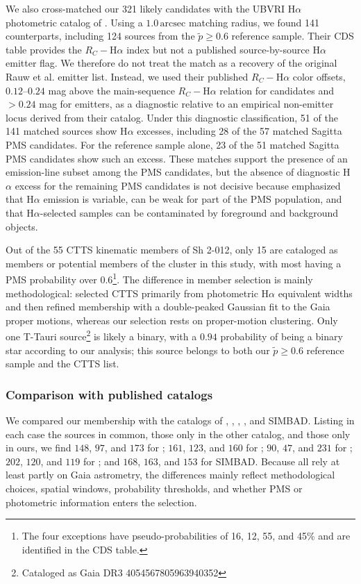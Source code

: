 \documentclass{aa}
\begin{document}
We also cross-matched our 321 likely candidates with the UBVRI H$\alpha$ photometric catalog of \citet{2010AA...511A..25R}. Using a $1.0\,\mathrm{arcsec}$ matching radius, we found 141 counterparts, including 124 sources from the $\tilde{p}\geq0.6$ reference sample. Their CDS table provides the $R_C-\mathrm{H}\alpha$ index but not a published source-by-source H$\alpha$ emitter flag. We therefore do not treat the match as a recovery of the original Rauw et al. emitter list. Instead, we used their published $R_C-\mathrm{H}\alpha$ color offsets, $0.12$--$0.24$ mag above the main-sequence $R_C-\mathrm{H}\alpha$ relation for candidates and $>0.24$ mag for emitters, as a diagnostic relative to an empirical non-emitter locus derived from their catalog. Under this diagnostic classification, 51 of the 141 matched sources show H$\alpha$ excesses, including 28 of the 57 matched Sagitta PMS candidates. For the reference sample alone, 23 of the 51 matched Sagitta PMS candidates show such an excess. These matches support the presence of an emission-line subset among the PMS candidates, but the absence of diagnostic H$\alpha$ excess for the remaining PMS candidates is not decisive because \citet{2010AA...511A..25R} emphasized that H$\alpha$ emission is variable, can be weak for part of the PMS population, and that H$\alpha$-selected samples can be contaminated by foreground and background objects.

Out of the 55 CTTS kinematic members of Sh 2-012, only 15 are cataloged as members or potential members of the cluster in this study, with most having a PMS probability over $0.6$\footnote{The four exceptions have pseudo-probabilities of 16, 12, 55, and 45\% and are identified in the CDS table.}. The difference in member selection is mainly methodological: \citet{2019MNRAS.484.5102K} selected CTTS primarily from photometric H$\alpha$ equivalent widths and then refined membership with a double-peaked Gaussian fit to the Gaia proper motions, whereas our selection rests on proper-motion clustering. Only one T-Tauri source\footnote{Cataloged as Gaia DR3 4054567805963940352} is likely a binary, with a $0.94$ probability of being a binary star according to our analysis; this source belongs to both our $\tilde{p}\geq0.6$ reference sample and the \citet{2019MNRAS.484.5102K} CTTS list.

\subsubsection{Comparison with published catalogs}
We compared our membership with the catalogs of \citet{2020AA...640A...1C}, \citet{2021ApJ...923..129J}, \citet{2022ApJS..262....7H}, \citet{2024arXiv240305143H}, and SIMBAD. Listing in each case the sources in common, those only in the other catalog, and those only in ours, we find $148$, $97$, and $173$ for \citet{2020AA...640A...1C}; $161$, $123$, and $160$ for \citet{2021ApJ...923..129J}; $90$, $47$, and $231$ for \citet{2022ApJS..262....7H}; $202$, $120$, and $119$ for \citet{2024arXiv240305143H}; and $168$, $163$, and $153$ for SIMBAD. Because all rely at least partly on Gaia astrometry, the differences mainly reflect methodological choices, spatial windows, probability thresholds, and whether PMS or photometric information enters the selection.
\end{document}
